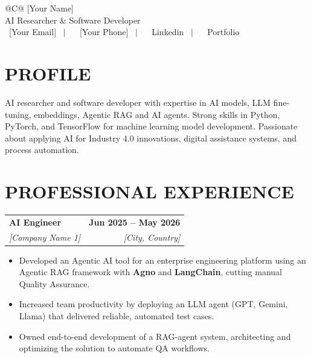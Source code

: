 \documentclass[a4paper,11pt]{article}
\makeatletter
\newcommand{\entryheader}[4]{%
  \begin{tabularx}{\textwidth}{@{}>{\RaggedRight\arraybackslash}X r@{}}
    \textbf{#1} & \textbf{#2} \\
    \textit{#3} & \textit{#4} \\
  \end{tabularx}%
}
\newenvironment{entrybullets}{%
  \begin{minipage}[t]{0.77\textwidth}
    \begin{itemize}[leftmargin=*,label=\textbullet,align=left]
}{%
    \end{itemize}
  \end{minipage}
}
\newcommand{\safehref}[2]{#2}
\let\href\safehref
\makeatother
\begin{document}
\pagestyle{empty}

\begin{tabularx}{\linewidth}{@{}C@{}}
  \Huge{[Your Name]}\\[10pt]
  
  \large{AI Researcher \& Software Developer}\\[3pt]


  \href{mailto: [Your Email]}{\raisebox{-0.05\height}{\faEnvelope} \ [Your Email]} \ $|$ \
  \href{tel:[Your Phone]}{ \ [Your Phone]} \ $|$ \
  \href{[Your LinkedIn URL]}{\raisebox{-0.05\height}{\faLinkedin} \ Linkedin} \ $|$ \
  \href{[Your Portfolio URL]}{\raisebox{-0.05\height}{\faLink} \ Portfolio}\\
\end{tabularx}

\section*{PROFILE}
AI researcher and software developer with expertise in AI models, LLM fine-tuning, embeddings, Agentic RAG and AI agents. Strong skills in Python, PyTorch, and TensorFlow for machine learning model development. Passionate about applying AI for Industry 4.0 innovations, digital assistance systems, and process automation.


\section*{PROFESSIONAL EXPERIENCE}
\entryheader{AI Engineer}{Jun 2025 -- May 2026}{[Company Name 1]}{[City, Country]}
\begin{entrybullets}
  \item Developed an Agentic AI tool for an enterprise engineering platform using an Agentic RAG framework with \textbf{Agno} and \textbf{LangChain}, cutting manual Quality Assurance.
  \item Increased team productivity by deploying an LLM agent (GPT, Gemini, Llama) that delivered reliable, automated test cases.
  \item Owned end-to-end development of a RAG-agent system, architecting and optimizing the solution to automate QA workflows.
\end{entrybullets}
\end{document}
